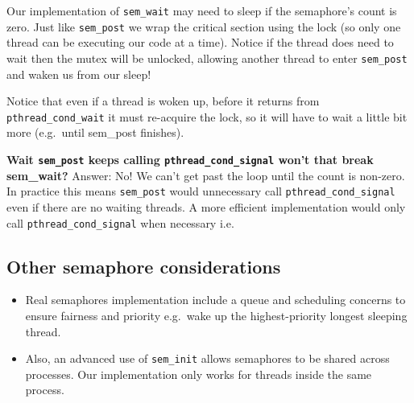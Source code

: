 Our implementation of \texttt{sem\_wait} may need to sleep if the
semaphore's count is zero. Just like \texttt{sem\_post} we wrap the
critical section using the lock (so only one thread can be executing our
code at a time). Notice if the thread does need to wait then the mutex
will be unlocked, allowing another thread to enter \texttt{sem\_post}
and waken us from our sleep!

Notice that even if a thread is woken up, before it returns from
\texttt{pthread\_cond\_wait} it must re-acquire the lock, so it will
have to wait a little bit more (e.g.~until sem\_post finishes).

\begin{Shaded}
\begin{Highlighting}[]
   \NormalTok{) \{}
  \NormalTok{\}}
\NormalTok{\}}
\end{Highlighting}
\end{Shaded}

\textbf{Wait \texttt{sem\_post} keeps calling
\texttt{pthread\_cond\_signal} won't that break sem\_wait?} Answer: No!
We can't get past the loop until the count is non-zero. In practice this
means \texttt{sem\_post} would unnecessary call
\texttt{pthread\_cond\_signal} even if there are no waiting threads. A
more efficient implementation would only call
\texttt{pthread\_cond\_signal} when necessary i.e.

\begin{Shaded}
\begin{Highlighting}[]
   \NormalTok{) }
\end{Highlighting}
\end{Shaded}

\subsection{Other semaphore
considerations}\label{other-semaphore-considerations}

\begin{itemize}
\tightlist
\item
  Real semaphores implementation include a queue and scheduling concerns
  to ensure fairness and priority e.g.~wake up the highest-priority
  longest sleeping thread.
\item
  Also, an advanced use of \texttt{sem\_init} allows semaphores to be
  shared across processes. Our implementation only works for threads
  inside the same process.
\end{itemize}

